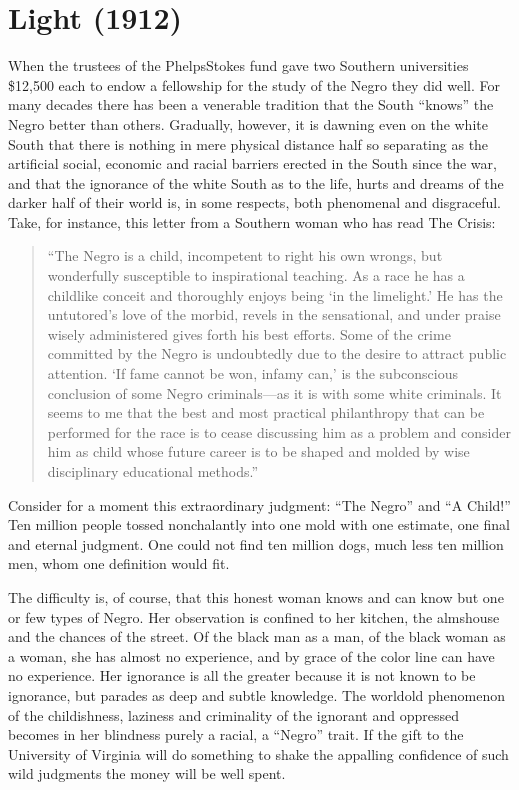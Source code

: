\documentclass[letterpaper,10pt,english]{jupyterBook}
\begin{document}
\section{Light (1912)}
\label{\detokenize{Volumes/03/04/light:light-1912}}\label{\detokenize{Volumes/03/04/light::doc}}
\sphinxAtStartPar
When the trustees of the Phelps\sphinxhyphen{}Stokes fund gave two Southern universities \$12,500 each to endow a fellowship for the study of the Negro they did well. For many decades there has been a venerable tradition that the South “knows” the Negro better than others. Gradually, however, it is dawning even on the white South that	there	is nothing in mere physical distance half so separating as the artificial social, economic and racial barriers erected in the South since the war, and that the ignorance of the white South as to the life, hurts and dreams of the darker half of their world is, in some respects, both phenomenal and disgraceful. Take, for instance, this letter from a Southern woman who has read The Crisis:
\begin{quote}

\sphinxAtStartPar
“The Negro is a child, incompetent to right his own wrongs, but wonderfully susceptible to inspirational teaching. As a race he has a childlike conceit and thoroughly enjoys being ‘in the limelight.’ He has the untutored’s love of the morbid, revels in the sensational, and under praise wisely ad­ministered gives forth his best efforts. Some of the crime committed by the Negro is undoubtedly due to the de­sire to attract public attention. ‘If fame cannot be won, infamy can,’ is the subconscious conclusion of some Negro criminals—as it is with some white criminals. It seems to me that the best and most practical philan­thropy that can be performed for the race is to cease discussing him as a problem and consider him as child whose future career is to be shaped and molded by wise disciplin­ary educational methods.”
\end{quote}

\sphinxAtStartPar
Consider for a moment this extraordinary judgment: “The Negro” and “A Child!” Ten million people tossed nonchalantly into one mold with one estimate, one final and eternal judg­ment. One could not find ten million dogs, much less ten million men, whom one definition would fit.

\sphinxAtStartPar
The difficulty is, of course, that this honest woman knows and can know but one or few types of Negro. Her observation is confined to her kitchen, the almshouse and the chances of the street. Of the black man as a man, of the black woman as a woman, she has almost no experience, and by grace of the color line can have no experience. Her ignorance is all the greater because it is not known to be ignorance, but parades as deep and subtle knowl­edge. The world\sphinxhyphen{}old phenomenon of the childishness, laziness and crimi­nality of the ignorant and oppressed becomes in her blindness purely a racial, a “Negro” trait. If the gift to the University of Virginia will do something to shake the appalling con­fidence of such wild judgments the money will be well spent.
\end{document}
